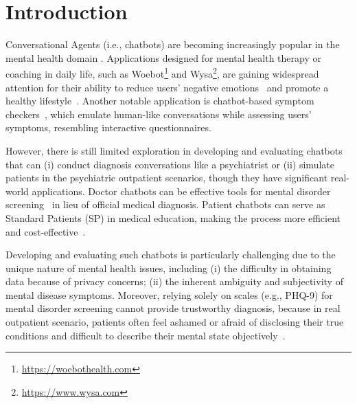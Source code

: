 \section{Introduction}
\label{sec:intro}



Conversational Agents (i.e., chatbots) are becoming increasingly popular in the mental health domain \cite{sabour2022chatbots}. Applications designed for mental health therapy or coaching in daily life, such as Woebot\footnote{\url{https://woebothealth.com}} and Wysa\footnote{\url{https://www.wysa.com}}, are gaining widespread attention for their ability to reduce users' negative emotions~\cite{Grove2021Codevelop} and promote a healthy lifestyle~\cite{Fadhil2019AssistiveCA}. Another notable application is chatbot-based symptom checkers~\cite{Yue2023Beyond}, which emulate human-like conversations while assessing users' symptoms, resembling interactive questionnaires.

However, there is still limited exploration in developing and evaluating chatbots that can (i) conduct diagnosis conversations like a psychiatrist
or (ii) simulate patients in the psychiatric outpatient scenarios, though they have significant real-world applications. 
Doctor chatbots can be effective tools for mental disorder screening~\cite{pacheco2021Smart} in lieu of official medical diagnosis. Patient chatbots can serve as Standard Patients (SP) in medical education, making the process more efficient and cost-effective~\cite{Torous2021growing}.

Developing and evaluating such chatbots is particularly challenging due to the unique nature of mental health issues, including (i) the difficulty in obtaining data because of privacy concerns; (ii) the inherent ambiguity and subjectivity of mental disease symptoms. 
Moreover, relying solely on scales (e.g., PHQ-9) for mental disorder screening cannot provide trustworthy diagnosis, because in real outpatient scenario, patients often feel ashamed or afraid of disclosing their true conditions and difficult to describe their mental state objectively~\cite{Salaheddine2016Identify}. 

